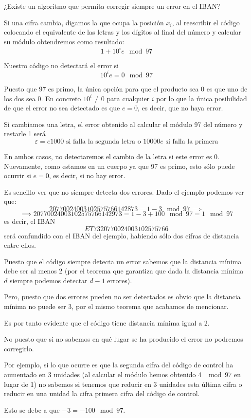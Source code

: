 \begin{problem}[1]
\ppart ¿Existe un algoritmo que permita corregir siempre un error en el IBAN?

\solution


\spart
Si una cifra cambia, digamos la que ocupa la posición $x_i$, al reescribir el código colocando el equivalente de las letras y los dígitos al final del número y calcular su módulo obtendremos como resultado:
\[1+10^ie \mod 97\]

Nuestro código no detectará el error si
\[10^ie = 0 \mod 97\]

Puesto que 97 es primo, la única opción para que el producto sea 0 es que uno de los dos sea 0. En concreto $10^i \neq 0$ para cualquier $i$ por lo que la única posibilidad de que el error no sea detectado es que $e=0$, es decir, que no haya error.

\spart
Si cambiamos una letra, el error obtenido al calcular el módulo 97 del número y restarle 1 será
\[ε = e1000 \text{ si falla la segunda letra o } 10000e  \text{ si falla la primera}\]

En ambos casos, no detectaremos el cambio de la letra si este error es 0. Nuevamente, como estamos en un cuerpo ya que 97 es primo, esto sólo puede ocurrir si $e=0$, es decir, si no hay error.

\spart

Es sencillo ver que no siempre detecta dos errores. Dado el ejemplo podemos ver que:
\[20770024003102575766142873 = 1 -3 \mod 97 \implies \]
\[\implies 20770024003102575766142973 = 1 -3 +100 \mod 97 =1 \mod 97\]
es decir, el IBAN
\[ET7320770024003102575766\]
será confundido con el IBAN del ejemplo, habiendo sólo dos cifras de distancia entre ellos.

\spart

Puesto que el código siempre detecta un error sabemos que la distancia mínima debe ser al menos 2 (por el teorema que garantiza que dada la distancia mínima $d$ siempre podemos detectar $d-1$ errores).

Pero, puesto que dos errores pueden no ser detectados es obvio que la distancia mínima no puede ser 3, por el mismo teorema que acabamos de mencionar.

Es por tanto evidente que el código tiene distancia mínima igual a 2.

\spart
No puesto que si no sabemos en qué lugar se ha producido el error no podremos corregirlo.

Por ejemplo, si lo que ocurre es que la segunda cifra del código de control ha aumentado en 3 unidades (al calcular el módulo hemos obtenido 4 $\mod 97$ en lugar de 1) no sabemos si tenemos que reducir en 3 unidades esta última cifra o reducir en una unidad la cifra primera cifra del código de control.

Esto se debe a que $-3=-100 \mod 97$.

\end{problem}

